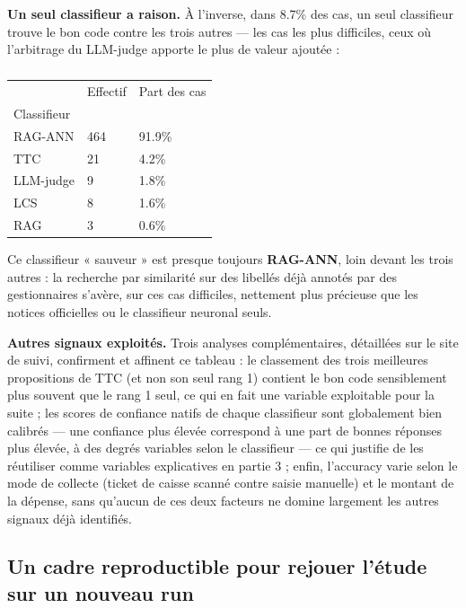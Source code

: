 \documentclass[
]{rapportCS}
\begin{document}
\textbf{Un seul classifieur a raison.} À l'inverse, dans 8.7\% des cas,
un seul classifieur trouve le bon code contre les trois autres --- les
cas les plus difficiles, ceux où l'arbitrage du LLM-judge apporte le
plus de valeur ajoutée :

{

\begin{longtable}[]{@{}lll@{}}

\caption{\label{tbl-seul-correct}}

\tabularnewline

\toprule\noalign{}
& Effectif & Part des cas \\
Classifieur & & \\
\midrule\noalign{}
\endhead
\bottomrule\noalign{}
\endlastfoot
RAG-ANN & 464 & 91.9\% \\
TTC & 21 & 4.2\% \\
LLM-judge & 9 & 1.8\% \\
LCS & 8 & 1.6\% \\
RAG & 3 & 0.6\% \\

\end{longtable}

}

Ce classifieur « sauveur » est presque toujours \textbf{RAG-ANN}, loin
devant les trois autres : la recherche par similarité sur des libellés
déjà annotés par des gestionnaires s'avère, sur ces cas difficiles,
nettement plus précieuse que les notices officielles ou le classifieur
neuronal seuls.

\textbf{Autres signaux exploités.} Trois analyses complémentaires,
détaillées sur le site de suivi, confirment et affinent ce tableau : le
classement des trois meilleures propositions de TTC (et non son seul
rang 1) contient le bon code sensiblement plus souvent que le rang 1
seul, ce qui en fait une variable exploitable pour la suite ; les scores
de confiance natifs de chaque classifieur sont globalement bien calibrés
--- une confiance plus élevée correspond à une part de bonnes réponses
plus élevée, à des degrés variables selon le classifieur --- ce qui
justifie de les réutiliser comme variables explicatives en partie 3 ;
enfin, l'accuracy varie selon le mode de collecte (ticket de caisse
scanné contre saisie manuelle) et le montant de la dépense, sans
qu'aucun de ces deux facteurs ne domine largement les autres signaux
déjà identifiés.

\subsection{Un cadre reproductible pour rejouer l'étude sur un nouveau
run}\label{un-cadre-reproductible-pour-rejouer-luxe9tude-sur-un-nouveau-run}
\end{document}
